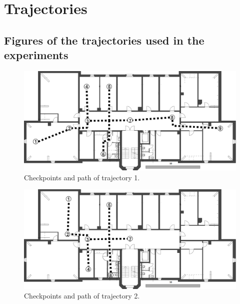 
\chapter{Trajectories} %

\label{AppendixA} %

\section{Figures of the trajectories used in the experiments}

\begin{figure}[th]
\centering
\includegraphics[width=1.0\textwidth]{Figures/trajectory1}
\decoRule
\caption[Trajectory 1]{Checkpoints and path of trajectory 1.}
\label{fig:trajectory1Appendix}
\end{figure}

\begin{figure}[th]
\centering
\includegraphics[width=1.0\textwidth]{Figures/trajectory2}
\decoRule
\caption[Trajectory 2]{Checkpoints and path of trajectory 2.}
\label{fig:trajectory2}
\end{figure}


